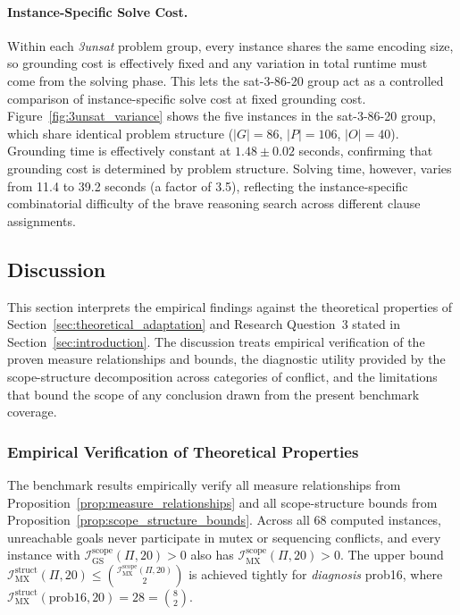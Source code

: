 \paragraph{Instance-Specific Solve Cost.}
Within each \textit{3unsat} problem group, every instance shares the same encoding size, so grounding cost is effectively fixed and any variation in total runtime must come from the solving phase. This lets the sat-3-86-20 group act as a controlled comparison of instance-specific solve cost at fixed grounding cost. Figure~\ref{fig:3unsat_variance} shows the five instances in the sat-3-86-20 group, which share identical problem structure ($|G| = 86$, $|P| = 106$, $|O| = 40$). Grounding time is effectively constant at $1.48 \pm 0.02$ seconds, confirming that grounding cost is determined by problem structure. Solving time, however, varies from 11.4 to 39.2 seconds (a factor of 3.5), reflecting the instance-specific combinatorial difficulty of the brave reasoning search across different clause assignments.



\subsection{Discussion}
\label{sec:eval_discussion}

This section interprets the empirical findings against the theoretical properties of Section~\ref{sec:theoretical_adaptation} and Research Question~3 stated in Section~\ref{sec:introduction}. The discussion treats empirical verification of the proven measure relationships and bounds, the diagnostic utility provided by the scope-structure decomposition across categories of conflict, and the limitations that bound the scope of any conclusion drawn from the present benchmark coverage.

\subsubsection{Empirical Verification of Theoretical Properties}

The benchmark results empirically verify all measure relationships from Proposition~\ref{prop:measure_relationships} and all scope-structure bounds from Proposition~\ref{prop:scope_structure_bounds}. Across all 68 computed instances, unreachable goals never participate in mutex or sequencing conflicts, and every instance with $\mathcal{I}^{\text{scope}}_{\text{GS}}(\Pi, 20) > 0$ also has $\mathcal{I}^{\text{scope}}_{\text{MX}}(\Pi, 20) > 0$. The upper bound $\mathcal{I}^{\text{struct}}_{\text{MX}}(\Pi, 20) \leq \binom{\mathcal{I}^{\text{scope}}_{\text{MX}}(\Pi, 20)}{2}$ is achieved tightly for \textit{diagnosis} prob16, where $\mathcal{I}^{\text{struct}}_{\text{MX}}(\text{prob16}, 20) = 28 = \binom{8}{2}$.


